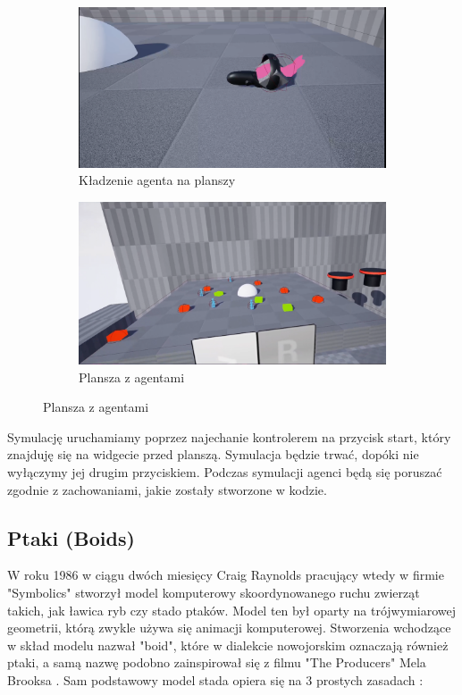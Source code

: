 \documentclass[a4paper,12pt,reqno]{article}
\begin{document}
\begin{figure}[H]%
	\centering
	\begin{subfigure}{.5\textwidth}
		\centering
		\includegraphics[width=0.8\linewidth]{graphics//agent/AgentInUE_3.png}
		\caption{Kładzenie agenta na planszy}	
		\label{ref:subref_a}
	\end{subfigure}%
	\begin{subfigure}{.5\textwidth}
		\centering
		\includegraphics[width=0.8\linewidth]{graphics//agent/AgentInUE_4.png}
		\caption{Plansza z agentami}
		\label{ref:subref_b}
	\end{subfigure}%
\label{ref:ref}
\end{figure}

Symulację uruchamiamy poprzez najechanie kontrolerem na przycisk start, który znajduję się na widgecie przed planszą. Symulacja będzie trwać, dopóki nie wyłączymy jej drugim przyciskiem. Podczas symulacji agenci będą się poruszać zgodnie z zachowaniami, jakie zostały stworzone w kodzie.

\newpage
\subsection{Ptaki (Boids)}

W roku 1986 w ciągu dwóch miesięcy Craig Raynolds pracujący wtedy w firmie "Symbolics" stworzył model komputerowy skoordynowanego ruchu zwierząt takich, jak ławica ryb czy stado ptaków. Model ten był oparty na trójwymiarowej geometrii, którą zwykle używa się animacji komputerowej. Stworzenia wchodzące w skład modelu nazwał "boid", które w dialekcie nowojorskim oznaczają również ptaki, a samą nazwę podobno zainspirował się z filmu "The Producers" Mela Brooksa \cite{boids_name}. Sam podstawowy model stada opiera się na 3 prostych zasadach \cite{flocking_system}:
\end{document}
